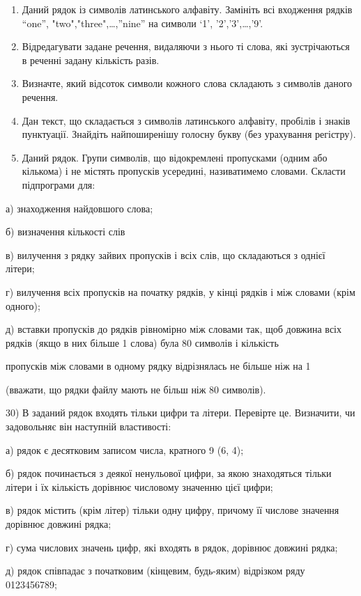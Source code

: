 \documentclass[]{article}
\begin{document}
\begin{enumerate}
\item
  Даний рядок із символів латинського алфавіту. Замініть всі входження
  рядків ``one'', "two","three",\ldots{},''nine'' на символи `1',
  '2','3',\ldots{},'9'.
\item
  Відредагувати задане речення, видаляючи з нього ті слова, які
  зустрічаються в реченні задану кількість разів.
\item
  Визначте, який відсоток символи кожного слова складають з символів
  даного речення.
\item
  Дан текст, що складається з символів латинського алфавіту, пробілів і
  знаків пунктуації. Знайдіть найпоширенішу голосну букву (без
  урахування регістру).
\item
  Даний рядок. Групи символів, що відокремлені пропусками (одним або
  кількома) і не містять пропусків усередині, називатимемо словами.
  Скласти підпрограми для:
\end{enumerate}

а) знаходження найдовшого слова;

б) визначення кількості слів

в) вилучення з рядку зайвих пропусків і всіх слів, що складаються з
однієї літери;

г) вилучення всіх пропусків на початку рядків, у кінці рядків і між
словами (крім одного);

д) вставки пропусків до рядків рівномірно між словами так, щоб довжина
всіх рядків (якщо в них більше 1 слова) була 80 символів і кількість

пропусків між словами в одному рядку відрізнялась не більше ніж на 1

(вважати, що рядки файлу мають не більш ніж 80 символів).

30) В заданий рядок входять тільки цифри та літери. Перевірте це.
Визначити, чи задовольняє він наступній властивості:

а) рядок є десятковим записом числа, кратного 9 (6, 4);

б) рядок починається з деякої ненульової цифри, за якою знаходяться
тільки літери і їх кількість дорівнює числовому значенню цієї цифри;

в) рядок містить (крім літер) тільки одну цифру, причому її числове
значення дорівнює довжині рядка;

г) сума числових значень цифр, які входять в рядок, дорівнює довжині
рядка;

д) рядок співпадає з початковим (кінцевим, будь-яким) відрізком ряду
0123456789;
\end{document}
